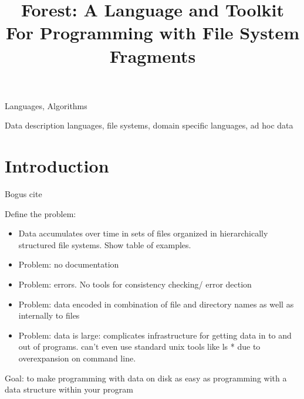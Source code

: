 \documentclass[natbib]{sigplanconf}
\begin{document}
\copyrightdata{} 

\title{Forest:  A Language and Toolkit For Programming with File System Fragments}

       {}
       {}
       {}


\maketitle{}

\begin{abstract}  

\end{abstract}


\terms
Languages, Algorithms

\keywords
Data description languages, file systems, domain specific languages, ad hoc data


\section {Introduction}
\label{sec:intro}

Bogus cite~\cite{fisher+:pads}

Define the problem:

\begin{itemize}
\item Data accumulates over time in sets of files organized in
hierarchically structured file systems.  Show table of examples.
\item Problem: no documentation
\item Problem: errors. No tools for consistency checking/ error dection
\item Problem: data encoded in combination of file and directory names as
well as internally to files
\item Problem: data is large: complicates infrastructure for
getting data in to and out of programs.  can't even use standard unix tools like ls * due to overexpansion
on command line.
\end{itemize}

Goal: to make programming with data on disk as easy as programming with a
data structure within your program
\end{document}
